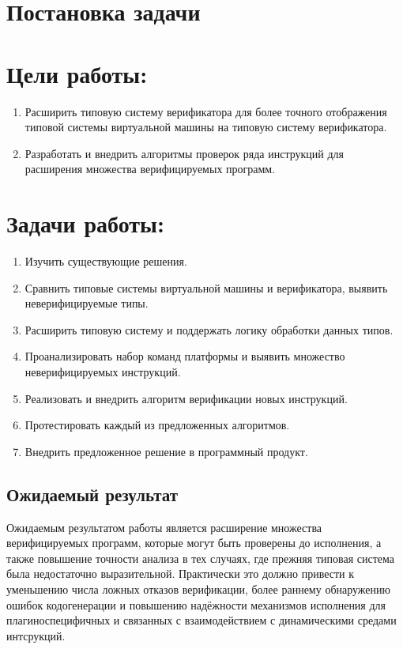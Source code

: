\section{Постановка задачи}
\label{sec:Chapter1} 

\section{Цели работы:}

\begin{enumerate}
    \item Расширить типовую систему верификатора для более точного отображения типовой
    системы виртуальной машины на типовую систему верификатора.
    \item Разработать и внедрить алгоритмы проверок ряда инструкций для расширения множества
    верифицируемых программ.
\end{enumerate}

\section{Задачи работы:}
\begin{enumerate}
    \item Изучить существующие решения.
    \item Сравнить типовые системы виртуальной машины и верификатора, выявить неверифицируемые типы.
    \item Расширить типовую систему и поддержать логику обработки данных типов.
    \item Проанализировать набор команд платформы и выявить множество неверифицируемых
    инструкций.
    \item Реализовать и внедрить алгоритм верификации новых инструкций.
    \item Протестировать каждый из предложенных алгоритмов.
    \item Внедрить предложенное решение в программный продукт.

\end{enumerate}

\subsection{Ожидаемый результат}

Ожидаемым результатом работы является расширение множества верифицируемых программ, которые могут быть
проверены до исполнения, а также повышение точности анализа в тех
случаях, где прежняя типовая система была недостаточно выразительной. Практически это должно
привести к уменьшению числа ложных отказов верификации, более раннему обнаружению ошибок
кодогенерации и повышению надёжности механизмов исполнения для плагиноспецифичных и связанных
с взаимодействием с динамическими средами интсрукций.

